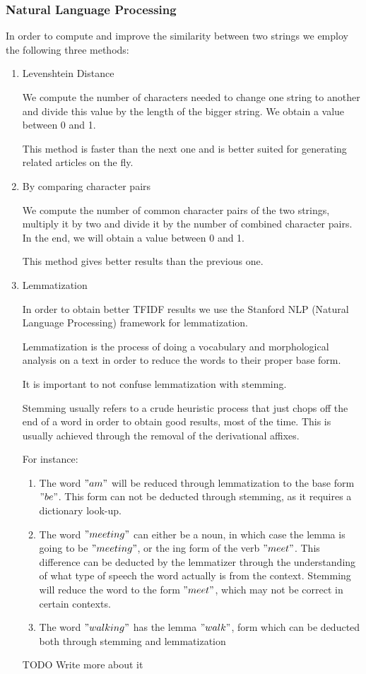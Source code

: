 \subsubsection{Natural Language Processing}
\label{sec:natural-language-processing}
In order to compute and improve the similarity between two strings we employ the following three methods:
\begin{enumerate}
	\item Levenshtein Distance

		We compute the number of characters needed to change one string to another and divide this value by the length of the bigger string. We obtain a value between 0 and 1.
		
		This method is faster than the next one and is better suited for generating related articles on the fly.

	\item By comparing character pairs
	
		We compute the number of common character pairs of the two strings, multiply it by two and divide it by the number of combined character pairs. In the end, we will obtain a value between 0 and 1.
		
		This method gives better results than the previous one.
	\item Lemmatization
		
		In order to obtain better TFIDF results we use the Stanford NLP (Natural Language Processing) framework for lemmatization.

		Lemmatization is the process of doing a vocabulary and morphological analysis on a text in order to reduce the words to their proper base form.

		It is important to not confuse lemmatization with stemming.

		Stemming usually refers to a crude heuristic process that just chops off the end of a word in order to obtain good results, most of the time. This is usually achieved through the removal of the derivational affixes.

		For instance:
		\begin{enumerate}
			\item The word $"am"$ will be reduced through lemmatization to the base form $"be"$. This form can not be deducted through stemming, as it requires a dictionary look-up.
			\item The word $"meeting"$ can either be a noun, in which case the lemma is going to be $"meeting"$, or the ing form of the verb $"meet"$. This difference can be deducted by the lemmatizer through the understanding of what type of speech the word actually is from the context. Stemming will reduce the word to the form $"meet"$, which may not be correct in certain contexts.
			\item The word $"walking"$ has the lemma $"walk"$, form which can be deducted both through stemming and lemmatization

		\end{enumerate}

		
		
		TODO Write more about it
\end{enumerate}

